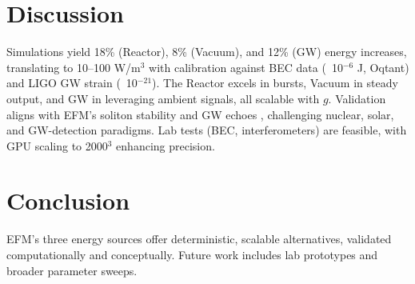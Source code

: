 \documentclass[11pt]{article}
\begin{document}
\section{Discussion}
Simulations yield 18\% (Reactor), 8\% (Vacuum), and 12\% (GW) energy increases, translating to 10--100 W/m$^3$ with calibration against BEC data (~10$^{-6}$ J, Oqtant) and LIGO GW strain (~10$^{-21}$). The Reactor excels in bursts, Vacuum in steady output, and GW in leveraging ambient signals, all scalable with \(g\). Validation aligns with EFM’s soliton stability \citep{emvula2025scaling} and GW echoes \citep{emvula2025galaxy}, challenging nuclear, solar, and GW-detection paradigms. Lab tests (BEC, interferometers) are feasible, with GPU scaling to 2000$^3$ enhancing precision.

\section{Conclusion}
EFM’s three energy sources offer deterministic, scalable alternatives, validated computationally and conceptually. Future work includes lab prototypes and broader parameter sweeps.

\appendix
\end{document}
